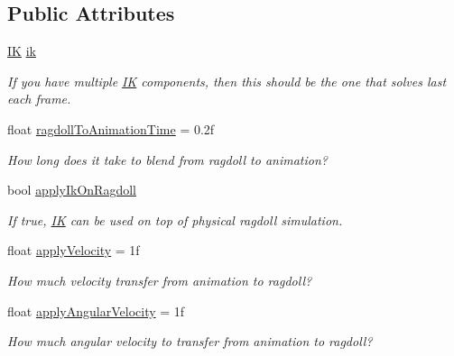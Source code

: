 \subsection*{Public Attributes}
\begin{DoxyCompactItemize}
\item 
\mbox{\hyperlink{class_root_motion_1_1_final_i_k_1_1_i_k}{IK}} \mbox{\hyperlink{class_root_motion_1_1_final_i_k_1_1_ragdoll_utility_a202bae1ae086c601515ea22bb4528824}{ik}}
\begin{DoxyCompactList}\small\item\em If you have multiple \mbox{\hyperlink{class_root_motion_1_1_final_i_k_1_1_i_k}{IK}} components, then this should be the one that solves last each frame. \end{DoxyCompactList}\item 
float \mbox{\hyperlink{class_root_motion_1_1_final_i_k_1_1_ragdoll_utility_a9422dbe433f0d9c65adce919f15c0d7a}{ragdoll\+To\+Animation\+Time}} = 0.\+2f
\begin{DoxyCompactList}\small\item\em How long does it take to blend from ragdoll to animation? \end{DoxyCompactList}\item 
bool \mbox{\hyperlink{class_root_motion_1_1_final_i_k_1_1_ragdoll_utility_a4dead4fe0a14de70523615d768281bbe}{apply\+Ik\+On\+Ragdoll}}
\begin{DoxyCompactList}\small\item\em If true, \mbox{\hyperlink{class_root_motion_1_1_final_i_k_1_1_i_k}{IK}} can be used on top of physical ragdoll simulation. \end{DoxyCompactList}\item 
float \mbox{\hyperlink{class_root_motion_1_1_final_i_k_1_1_ragdoll_utility_acde8b9d830caaebac58d45b03b12af9a}{apply\+Velocity}} = 1f
\begin{DoxyCompactList}\small\item\em How much velocity transfer from animation to ragdoll? \end{DoxyCompactList}\item 
float \mbox{\hyperlink{class_root_motion_1_1_final_i_k_1_1_ragdoll_utility_ad12b44720d17d4201b709ae33cae84f7}{apply\+Angular\+Velocity}} = 1f
\begin{DoxyCompactList}\small\item\em How much angular velocity to transfer from animation to ragdoll? \end{DoxyCompactList}\end{DoxyCompactItemize}


